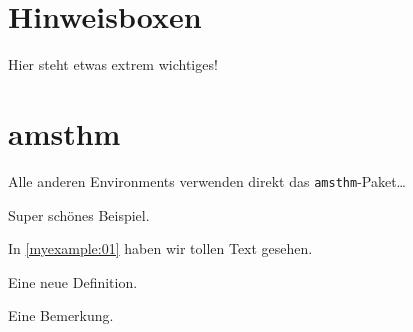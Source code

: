 \section{Hinweisboxen}
\begin{mycaution}
  Hier steht etwas extrem wichtiges! 
\end{mycaution}

\section{amsthm}
Alle anderen Environments verwenden direkt das \texttt{amsthm}-Paket\dots

\begin{myexample}\label{myexample:01}
  Super schönes Beispiel. \lipsum[1]
\end{myexample}

In \cref{myexample:01} haben wir tollen Text gesehen.

\begin{mydefinition}
  Eine neue Definition.
\end{mydefinition}

\begin{myremark}
  Eine Bemerkung.
\end{myremark}
